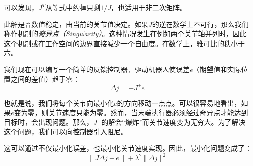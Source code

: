 
可以发现，$J^T$从等式中约掉只剩$1/J$，也适用于非二次矩阵。


此解是否数值稳定，由当前的关节值决定。如果$J$的逆在数学上不可行，那么我们称作机制的\emph{奇异点（Singularity）}。这种情况发生在例如两个关节轴并列时，因此这个机制或在工作空间的边界直接减少一个自由度。在数学上，雅可比的秩小于六。


我们现在可以编写一个简单的反馈控制器，驱动机器人使误差$e$（期望值和实际位置之间的差值）趋于零：
\begin{equation}
\Delta{j}=-J^+e
\end{equation}



也就是说，我们将每个关节向最小化$e$的方向移动一点点。可以很容易地看出，如果$e$变为零，则关节速度只能为零。然而，当末端执行器必须经过奇异点才能达到目标时，会出现问题。那么，$J^+$的解会“爆炸”而关节速度变为无穷大。为了解决这个问题，我们可以向控制器引入阻尼。

这可以通过不仅最小化误差，也最小化关节速度实现。因此，最小化问题变成了：
\begin{equation}
\|J\Delta j-e\|+\lambda^2\|\Delta j\|^2
\end{equation}

